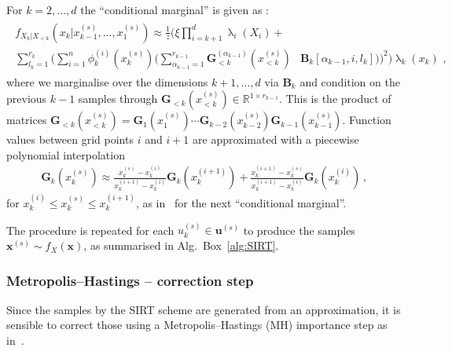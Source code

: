 For $k = 2, \dots,d$ the ``conditional marginal'' is given as \cite[Eq.~31]{cui2022deep}:
\begin{align}\begin{split} 
		f_{X_k|X_{<k}}(x_k|x^{(s)}_{k-1},\dots,x^{(s)}_1) \approx \frac{1}{z}
		\Bigg( 
		\xi \prod_{i=k+1}^{d} \uplambda_i(X_i) +&  \\
		\sum_{l_{k} = 1}^{r_{k}} \Bigg( \sum_{i = 1}^{n}  \phi^{(i)}_k(x^{(s)}_k) \bigg( \sum_{\alpha_{k-1} = 1}^{r_{k-1}} \bm{G}^{(\alpha_{k-1})}_{<k}(x^{(s)}_{<k}) &\bm{B}_k[\alpha_{k-1},i,l_k] \bigg) \Bigg)^2 \Bigg) \uplambda_k(x_k) \, \,  ,
	\end{split} 
	\label{eq:CurrMarg} 
\end{align}
where we marginalise over the dimensions $k+1 , \dots, d$ via $\bm{B}_k$ and condition on the previous $k-1$ samples through $\bm{G}_{<k}(x^{(s)}_{<k})\in \mathbb{R}^{1 \times r_{k-1}}$.
This is the product of matrices $\bm{G}_{<k}(x^{(s)}_{<k}) = \bm{G}_{1}(x^{(s)}_{1}) \cdots \bm{G}_{k-2}(x^{(s)}_{k-2}) \bm{G}_{k-1}(x^{(s)}_{k-1}) $.
Function values between grid points $i$ and $i+1$ are approximated with a piecewise polynomial interpolation
\begin{align}
	\bm{G}_k(x^{(s)}_k) \approx   \frac{x^{(s)}_k - x^{(i)}_k }{x^{(i+1)}_k -x^{(i)}_k } \bm{G}_k(x^{(i+1)}_k) + \frac{ x^{(i+1)}_k - x^{(s)}_k}{x^{(i+1)}_k -x^{(i)}_k } \bm{G}_k(x^{(i)}_k) \, ,
	\label{eq:LinPol}
\end{align}
for $x^{(i)}_k \leq x^{(s)}_k \leq x^{(i+1)}_k$, as in~\cite{dolgov2020approximation} for the next ``conditional marginal''.

The procedure is repeated for each $u^{(s)}_k \in \bm{u}^{(s)}$ to produce the samples $\bm{x}^{(s)} \sim f_{X}(\bm{x})$, as summarised in Alg.~Box~\ref{alg:SIRT}.%



\subsubsection{Metropolis--Hastings -- correction step}
Since the samples by the SIRT scheme are generated from an approximation, it is sensible to correct those using a Metropolis--Hastings (MH) importance step as in~\cite{dolgov2020approximation}.

